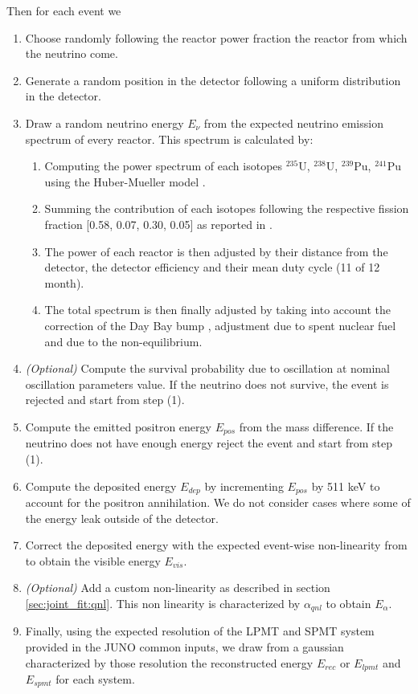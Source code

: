 \documentclass[../main.tex]{subfiles}
\begin{document}
Then for each event we
\begin{enumerate}
  \item Choose randomly following the reactor power fraction the reactor from which the neutrino come.
  \item Generate a random position in the detector following a uniform distribution in the detector.
  \item Draw a random neutrino energy $E_{\nu}$ from the expected neutrino emission spectrum of every reactor. This spectrum is calculated by:
    \begin{enumerate}
      \item Computing the power spectrum of each isotopes $^{235}$U, $^{238}$U, $^{239}$Pu, $^{241}$Pu using the Huber-Mueller model \cite{huber_determination_2011, mueller_improved_2011}.
      \item Summing the contribution of each isotopes following the respective fission fraction [0.58, 0.07, 0.30, 0.05] as reported in \cite{ma_improved_2013}.
      \item The power of each reactor is then adjusted by their distance from the detector, the detector efficiency and their mean duty cycle (11 of 12 month).
      \item The total spectrum is then finally adjusted by taking into account the correction of the Day Bay bump \cite{daya_bay_collaboration_measurement_2016}, adjustment due to spent nuclear fuel and due to the non-equilibrium.
    \end{enumerate}
  \item \textit{(Optional)} Compute the survival probability due to oscillation at nominal oscillation parameters value. If the neutrino does not survive, the event is rejected and start from step (1).
  \item Compute the emitted positron energy $E_{pos}$ from the mass difference. If the neutrino does not have enough energy reject the event and start from step (1).
  \item Compute the deposited energy $E_{dep}$ by incrementing $E_{pos}$ by 511 keV to account for the positron annihilation. We do not consider cases where some of the energy leak outside of the detector.
  \item Correct the deposited energy with the expected event-wise non-linearity from \cite{juno_collaboration_calibration_2021} to obtain the visible energy $E_{vis}$.
  \item \textit{(Optional)} Add a custom non-linearity as described in section \ref{sec:joint_fit:qnl}. This non linearity is characterized by $\alpha_{qnl}$ to obtain $E_{\alpha}$.
  \item Finally, using the expected resolution of the LPMT and SPMT system provided in the JUNO common inputs, we draw from a gaussian characterized by those resolution the reconstructed energy $E_{rec}$ or $E_{lpmt}$ and $E_{spmt}$ for each system.
\end{enumerate}
\end{document}
